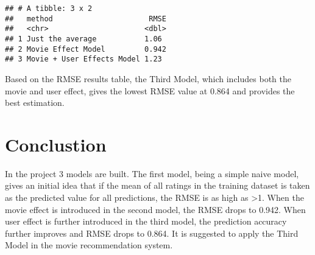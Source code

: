 \documentclass[]{article}
\begin{document}
\begin{verbatim}
## # A tibble: 3 x 2
##   method                      RMSE
##   <chr>                      <dbl>
## 1 Just the average           1.06 
## 2 Movie Effect Model         0.942
## 3 Movie + User Effects Model 1.23
\end{verbatim}

Based on the RMSE results table, the Third Model, which includes both
the movie and user effect, gives the lowest RMSE value at 0.864 and
provides the best estimation.

\section{Conclustion}\label{conclustion}

In the project 3 models are built. The first model, being a simple naive
model, gives an initial idea that if the mean of all ratings in the
training dataset is taken as the predicted value for all predictions,
the RMSE is as high as \textgreater{}1. When the movie effect is
introduced in the second model, the RMSE drops to 0.942. When user
effect is further introduced in the third model, the prediction accuracy
further improves and RMSE drops to 0.864. It is suggested to apply the
Third Model in the movie recommendation system.
\end{document}
